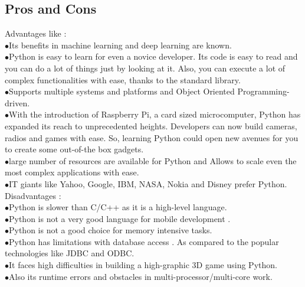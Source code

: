 \subsection{Pros and Cons}
Advantages like :\cite{web007}\\
\indent$\bullet$Its benefits in machine learning and deep learning are known.\\
\indent$\bullet$Python is easy to learn for even a novice developer. Its code is easy to read and you can do a lot of things just by looking at it. Also, you can execute a lot of complex functionalities with ease, thanks to the standard library.\\
\indent$\bullet$Supports multiple systems and platforms and Object Oriented Programming-driven.\\
\indent$\bullet$With the introduction of Raspberry Pi, a card sized microcomputer, Python has expanded its reach to unprecedented heights. Developers can now build cameras, radios and games with ease. So, learning Python could open new avenues for you to create some out-of-the box gadgets.\\
\indent$\bullet$large number of resources are available for Python and Allows to scale even the most complex applications with ease.\\
\indent$\bullet$IT giants like Yahoo, Google, IBM, NASA, Nokia and Disney prefer Python.\\
Disadvantages :\\
\indent$\bullet$Python is slower than C/C++ as it is a high-level language.\\
\indent$\bullet$Python is not a very good language for mobile development .\\
\indent$\bullet$Python is not a good choice for memory intensive tasks.\\
\indent$\bullet$Python has limitations with database access . As compared to the popular technologies like JDBC and ODBC.\\
\indent$\bullet$It faces high difficulties in building a high-graphic 3D game using Python.\\
\indent$\bullet$Also its runtime errors and obstacles in multi-processor/multi-core work.
